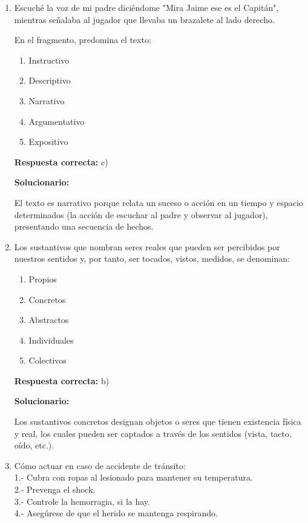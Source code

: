 \begin{enumerate}[resume]

\item Escuché la voz de mi padre diciéndome "Mira Jaime ese es el Capitán", mientras señalaba al jugador que llevaba un brazalete al lado derecho.

En el fragmento, predomina el texto:

\begin{enumerate}[label=\alph*)]
	\item Instructivo
	\item Descriptivo
	\item Narrativo
	\item Argumentativo
	\item Expositivo
\end{enumerate}

\textbf{Respuesta correcta:} c)

\vspace{2mm}
\textbf{Solucionario:}

El texto es narrativo porque relata un suceso o acción en un tiempo y espacio determinados (la acción de escuchar al padre y observar al jugador), presentando una secuencia de hechos.

\vspace{6mm}

\item Los sustantivos que nombran seres reales que pueden ser percibidos por nuestros sentidos y, por tanto, ser tocados, vistos, medidos, se denominan:

\begin{enumerate}[label=\alph*)]
	\item Propios
	\item Concretos
	\item Abstractos
	\item Individuales
	\item Colectivos
\end{enumerate}

\textbf{Respuesta correcta:} b)

\vspace{2mm}
\textbf{Solucionario:}

Los sustantivos concretos designan objetos o seres que tienen existencia física y real, los cuales pueden ser captados a través de los sentidos (vista, tacto, oído, etc.).

\vspace{6mm}

\item Cómo actuar en caso de accidente de tránsito:\\
1.- Cubra con ropas al lesionado para mantener su temperatura.\\
2.- Prevenga el shock.\\
3.- Controle la hemorragia, si la hay.\\
4.- Asegúrese de que el herido se mantenga respirando.


\end{enumerate}
